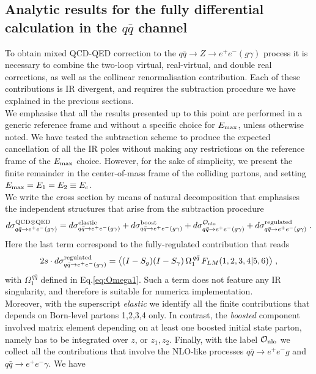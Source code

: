 \documentclass[12pt,a4paper]{article}
\newcommand{\beq}{\begin{eqnarray}}
\newcommand{\eeq}{\end{eqnarray}}
\begin{document}
\subsection{Analytic results for the fully differential calculation in the $q\bar{q}$ channel}
To obtain mixed QCD-QED correction to the $q\bar{q} \rightarrow Z \rightarrow e^+e^- (g\gamma)$ process it is necessary to combine the two-loop virtual, real-virtual, and double real corrections, as well as the collinear renormalisation contribution. Each of these contributions is IR divergent, and requires the subtraction procedure we have explained in the previous sections.  \\
We emphasise that all the results presented up to this point are performed in a generic reference frame and without a specific choice for $E_{\rm max}$, unless otherwise noted. We have tested the subtraction scheme to produce the expected cancellation of all the IR poles without making any restrictions on the reference frame of the $E_{\rm max}$ choice. However, for the sake of simplicity, we present the finite remainder in the center-of-mass frame of the colliding partons, and setting  $E_{\rm max}=E_1=E_2\equiv E_c$. \\
We write the cross section by means of natural decomposition that emphasises the independent structures that arise from the subtraction procedure
\beq
d \sigma^{\rm QCD \otimes QED}_{q\bar{q} \rightarrow e^+e^-(g\gamma)}
=
d \sigma^{\rm elastic}_{q\bar{q} \rightarrow e^+e^-(g\gamma)}
+
d \sigma^{\rm boost}_{q\bar{q} \rightarrow e^+e^-(g\gamma)}
+
d \sigma^{\mathcal{O}_{\rm nlo}}_{q\bar{q} \rightarrow e^+e^-(g\gamma)}
+
d \sigma^{\rm regulated}_{q\bar{q} \rightarrow e^+e^-(g\gamma)} \; .
\eeq
Here the last term correspond to the fully-regulated contribution that reads
\beq
2s\cdot d \sigma^{\rm regulated}_{q\bar{q} \rightarrow e^+e^-(g\gamma)}
=
\big\langle (I-S_g) (I-S_\gamma) \, \Omega^{\, q\bar{q}}_1 \, F_{LM}(1,2,3,4|5,6)\big\rangle \; ,
\eeq
with $\Omega^{\, q\bar{q}}_1$ defined in Eq.\eqref{eq:Omega1}. Such a term does not feature any IR singularity, and therefore is suitable for numerica implementation. \\
Moreover, with the superscript {\it elastic} we identify all the finite contributions that depends on Born-level partons 1,2,3,4 only.  In contrast, the {\it boosted} component involved matrix element depending on at least one boosted initial state parton, namely has to be integrated over $z$, or $z_1, z_2$. Finally, with the label $\mathcal{O}_{\rm nlo}$ we collect all the contributions that involve the NLO-like processes $q\bar{q} \rightarrow e^+e^-g$ and $q\bar{q} \rightarrow e^+e^-\gamma$. We have
\end{document}
